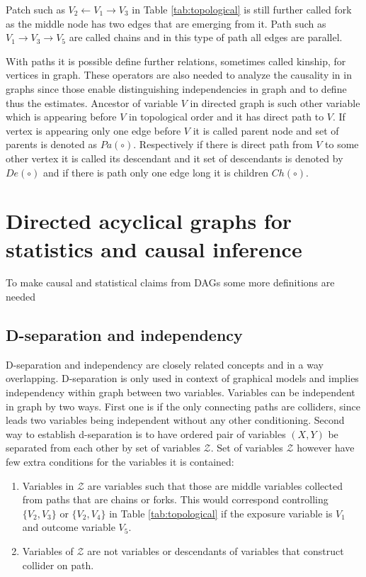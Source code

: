 \documentclass[main=english,12pt,a4paper,pdftex,econ,utf8]{aaltothesis}
\newcommand{\ch}[1]{Ch(#1)}
\newcommand{\pa}[1]{Pa(#1)}
\newcommand{\de}[1]{De(#1)}
\newcommand{\z}{\mathcal{Z}}
\begin{document}
Patch such as $V_{2}\leftarrow V_{1}\rightarrow V_{3}$ in Table \ref{tab:topological} is still further called fork as the middle node has two edges that are emerging from it. Path such as $V_{1}\rightarrow V_{3}\rightarrow V_{5}$ are called chains and in this type of path all edges are parallel.

With paths it is possible define further relations, sometimes called kinship, for vertices in graph. These operators are also needed to analyze the causality in in graphs since those enable distinguishing independencies in graph and to define thus the estimates. Ancestor of variable $V$ in directed graph is such other variable which is appearing before $V$ in topological order and it has direct path to $V$. If vertex is appearing only one edge before $V$ it is called parent node and set of parents is denoted as $\pa{\circ}$. Respectively if there is direct path from $V$ to some other vertex it is called its descendant and it set of descendants is denoted by $\de{\circ}$ and if there is path only one edge long it is children $\ch{\circ}$.

\clearpage

\section{Directed acyclical graphs for statistics and causal inference}

To make causal and statistical claims from DAGs some more definitions are needed 

\subsection{D-separation and independency}

D-separation and independency are closely related concepts and in a way overlapping. D-separation is only used in context of graphical models and implies independency within graph between two variables. Variables can be independent in graph by two ways. First one is if the only connecting paths are colliders, since leads two variables being independent without any other conditioning. Second way to establish d-separation is to have ordered pair of variables $(X, Y)$ be separated from each other by set of variables $\z$. Set of variables $\z$ however have few extra conditions for the variables it is contained:

\begin{enumerate}
    \item Variables in $\z$ are variables such that those are middle variables collected from paths that are chains or forks. This would correspond controlling $\{V_{2},V_{3}\}$ or $\{V_{2},V_{4}\}$ in Table \ref{tab:topological} if the exposure variable is $V_{1}$ and outcome variable $V_{5}$.
    \item Variables of $\z$ are not variables or descendants of variables that construct collider on path.
\end{enumerate}
\end{document}
